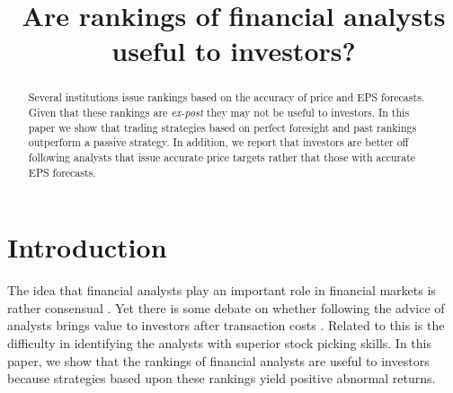 \documentclass{article}\usepackage[]{graphicx}\usepackage[]{color}
\begin{document}
\title{Are rankings of financial analysts useful to investors?}



\maketitle

\begin{abstract}
Several institutions issue rankings based on the accuracy of price and EPS forecasts. Given that these rankings are \textit{ex-post} they may not be useful to investors. In this paper  we show that trading strategies based on perfect foresight and past rankings outperform a passive strategy.  In addition, we report that investors are better off following analysts that issue  accurate price targets rather that those with accurate EPS forecasts. 
\end{abstract}

\section{Introduction}
\label{sec:intro}

The idea that financial analysts play an important role in financial markets is rather consensual \citep{cowles1933csm,obrien1990}. Yet there is some debate on whether following the advice of analysts brings value to investors after transaction costs \citep{womack1996,mikhail2004sae,li2005persistence}. Related to this is the difficulty in identifying the analysts with superior stock picking skills. In this paper, we show that the rankings of financial analysts are useful to investors because strategies based upon these rankings yield positive abnormal returns.
\end{document}

